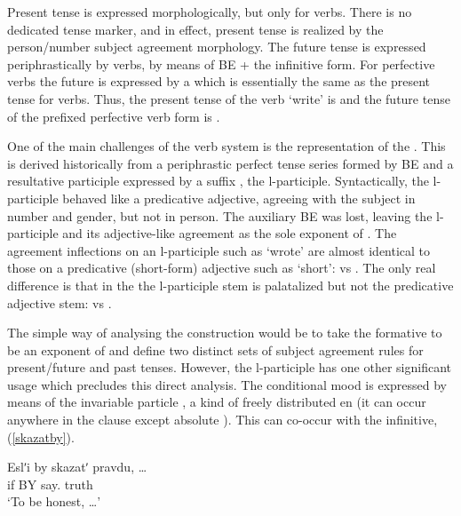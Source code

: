 \documentclass[output=paper,
modfonts
]{LSP/langsci}
\begin{document}
Present tense is expressed morphologically, but only for  verbs. There is no dedicated tense marker, and in effect, present tense is realized by the person/number subject agreement morphology. The future tense is expressed periphrastically by  verbs, by means of BE + the infinitive form. For perfective verbs the future is expressed by a  which is essentially the same as the present tense  for  verbs. Thus, the present tense  of the  verb  ‘write’ is  and the  future tense  of the prefixed perfective verb form  is .

One of the main challenges of the  verb system is the representation of the . This is derived historically from a periphrastic perfect tense series formed by  BE and a resultative participle expressed by a suffix , the l-participle. Syntactically, the l-participle behaved like a predicative adjective, agreeing with the subject in number and gender, but not in person. The auxiliary BE was lost, leaving the l-participle and its adjective-like agreement as the sole exponent of . The  agreement inflections on an l-participle such as  ‘wrote’ are almost identical to those on a predicative (short-form) adjective such as  ‘short’:   vs . The only real difference is that in the  the l-participle stem is palatalized but not the predicative adjective stem:  vs . 

The simple way of analysing the  construction would be to take the  formative to be an exponent of  and define two distinct sets of subject agreement rules for present/future and past tenses. However, the l-participle has one other significant usage which precludes this direct analysis. The conditional mood is expressed by means of the invariable particle , a kind of freely distributed en (it can occur anywhere in the clause except absolute ). This can co-occur with the infinitive, (\ref{skazatby}). 

\noindent\begin{exe} \ex \label{skazatby}

\gll	Eslʹi by skazatʹ pravdu, \ldots\\
	if BY say. truth\\
      \glt `To be honest, \ldots’

\end{exe}
 
\end{document}
